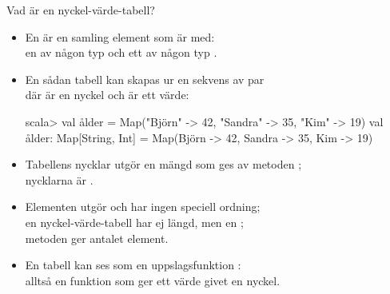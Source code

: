 

\begin{Slide}{Vad är en nyckel-värde-tabell?}\SlideFontSmall
\begin{itemize}
\item En  är en samling element som är  med:\\
en  av någon typ  och ett  av någon typ .
\item En sådan tabell kan skapas ur en sekvens av par \\
där  är en nyckel och  är ett värde:
\begin{REPL}
scala> val ålder = Map("Björn" -> 42, "Sandra" -> 35, "Kim" -> 19)
val ålder: Map[String, Int] = Map(Björn -> 42, Sandra -> 35, Kim -> 19)
\end{REPL}
\item Tabellens nycklar utgör en mängd som ges av metoden ;\\
nycklarna är .
\item Elementen utgör  och har ingen speciell ordning;
\\en nyckel-värde-tabell har ej längd, men en ;\\metoden {} ger antalet element.
\pause
\item En tabell kan ses som en uppslagsfunktion :\\alltså en funktion  som ger ett värde givet en nyckel.
\end{itemize}
\end{Slide}


